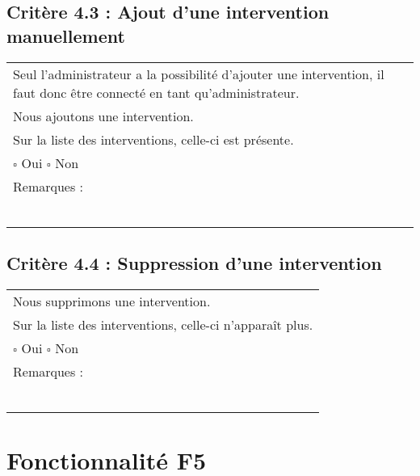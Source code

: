   	\subsection*{Critère 4.3 : Ajout d'une intervention manuellement}
  		\begin{center}
    	 		\begin{tabular}[h]{|p{}|}
			\hline
				Seul l'administrateur a la possibilité d'ajouter une intervention, il faut donc être connecté en tant qu'administrateur. \\
				Nous ajoutons une intervention. \\
				Sur la liste des interventions, celle-ci est présente. \\
				
				$\square$ Oui  \hfill \hfill $\square$ Non \\\hline Remarques : \\ ~\\
			 \\\hline
     		\end{tabular}
  		\end{center}	
  		
  	\subsection*{Critère 4.4 : Suppression d'une intervention}
  		\begin{center}
    	 		\begin{tabular}[h]{|p{}|}
			\hline
				Nous supprimons une intervention. \\
				Sur la liste des interventions, celle-ci n'apparaît plus. \\
				
				$\square$ Oui  \hfill \hfill $\square$ Non \\\hline Remarques : \\ ~\\
			 \\\hline
     		\end{tabular}
  		\end{center}	

\section{Fonctionnalité F5}
